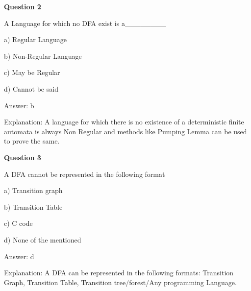 \documentclass{article}
\begin{document}
\begin{mdframed}[linewidth=1pt, roundcorner=5pt, linecolor=gray!30, backgroundcolor=gray!5]
\textbf{Question 2} 

A Language for which no DFA exist is a\_\_\_\_\_\_\_\_

a) Regular Language

b) Non-Regular Language

c) May be Regular

d) Cannot be said
\vspace{5pt} \par
\begin{tcolorbox}[colback=green!5, colframe=green!40!black, title=Solution]
Answer: b

Explanation: A language for which there is no existence of a deterministic finite automata is always Non Regular and methods like Pumping Lemma can be used to prove the same.
\end{tcolorbox}
\end{mdframed}

\begin{mdframed}[linewidth=1pt, roundcorner=5pt, linecolor=gray!30, backgroundcolor=gray!5]
\textbf{Question 3} 

A DFA cannot be represented in the following format

a) Transition graph

b) Transition Table

c) C code

d) None of the mentioned
\vspace{5pt} \par
\begin{tcolorbox}[colback=green!5, colframe=green!40!black, title=Solution]
Answer: d

Explanation: A DFA can be represented in the following formats: Transition Graph, Transition Table, Transition tree/forest/Any programming Language.
\end{tcolorbox}
\end{mdframed}
\newpage
\end{document}
